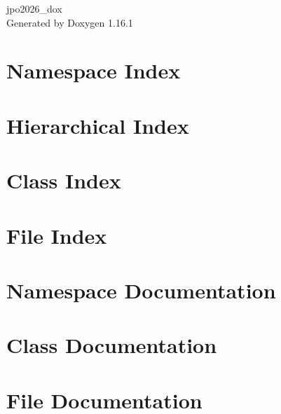 \documentclass[twoside]{book}
\newcommand{\+}{\discretionary{\mbox{\scriptsize$\hookleftarrow$}}{}{}}
\newcommand{\clearemptydoublepage}{%
    \newpage{\pagestyle{empty}\cleardoublepage}%
  }
\begin{document}
  \raggedbottom
    \hypersetup{pageanchor=false,
                bookmarksnumbered=true,
                pdfencoding=unicode
               }
  \begin{titlepage}
  \vspace*{7cm}
  \begin{center}%
  {\Large jpo2026\+\_\+dox}\\
  \vspace*{1cm}
  {\large Generated by Doxygen 1.16.1}\\
  \end{center}
  \end{titlepage}
  \clearemptydoublepage
  \tableofcontents
  \clearemptydoublepage
  \hypersetup{pageanchor=true}
\chapter{Namespace Index}

\chapter{Hierarchical Index}

\chapter{Class Index}

\chapter{File Index}

\chapter{Namespace Documentation}

\chapter{Class Documentation}

\chapter{File Documentation}




  \backmatter
  \newpage
  \clearemptydoublepage
  \printindex
\end{document}
